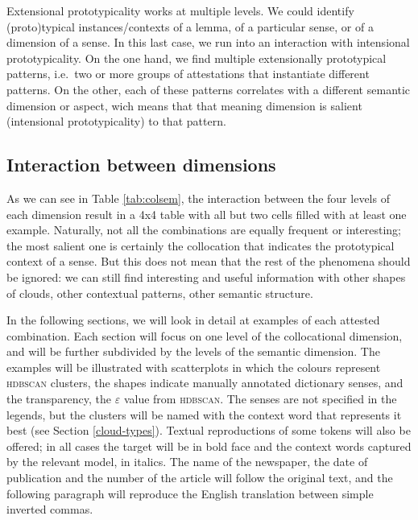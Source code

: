 \documentclass[
]{book}
\begin{document}
Extensional prototypicality works at multiple levels. We could identify (proto)typical instances/contexts of a lemma, of a particular sense, or of a dimension of a sense. In this last case, we run into an interaction with intensional prototypicality. On the one hand, we find multiple extensionally prototypical patterns, i.e.~two or more groups of attestations that instantiate different patterns. On the other, each of these patterns correlates with a different semantic dimension or aspect, wich means that that meaning dimension is salient (intensional prototypicality) to that pattern.

\hypertarget{interaction-between-dimensions}{%
\subsection{Interaction between dimensions}\label{interaction-between-dimensions}}

As we can see in Table \ref{tab:colsem}, the interaction between the four levels of each dimension result in a 4x4 table with all but two cells filled with at least one example. Naturally, not all the combinations are equally frequent or interesting; the most salient one is certainly the collocation that indicates the prototypical context of a sense. But this does not mean that the rest of the phenomena should be ignored: we can still find interesting and useful information with other shapes of clouds, other contextual patterns, other semantic structure.

In the following sections, we will look in detail at examples of each attested combination. Each section will focus on one level of the collocational dimension, and will be further subdivided by the levels of the semantic dimension.
The examples will be illustrated with scatterplots in which the colours represent \textsc{hdbscan} clusters, the shapes indicate manually annotated dictionary senses, and the transparency, the \(\varepsilon\) value from \textsc{hdbscan}. The senses are not specified in the legends, but the clusters will be named with the context word that represents it best (see Section \ref{cloud-types}). Textual reproductions of some tokens will also be offered; in all cases the target will be in bold face and the context words captured by the relevant model, in italics. The name of the newspaper, the date of publication and the number of the article will follow the original text, and the following paragraph will reproduce the English translation between simple inverted commas.
\end{document}
